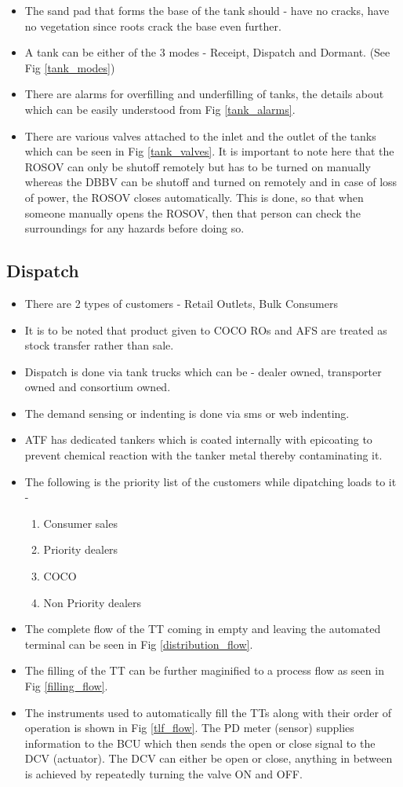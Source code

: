 \documentclass{report}
\begin{document}
\begin{itemize}
		\item The sand pad that forms the base of the tank should - have no cracks, have no vegetation since roots crack the base even further.
		\item A tank can be either of the 3 modes - Receipt, Dispatch and Dormant. (See Fig \ref{tank_modes})
		\item There are alarms for overfilling and underfilling of tanks, the details about which can be easily understood from Fig \ref{tank_alarms}.
		\item There are various valves attached to the inlet and the outlet of the tanks which can be seen in Fig \ref{tank_valves}. It is important to note here that the ROSOV can only be shutoff remotely but has to be turned on manually whereas the DBBV can be shutoff and turned on remotely and in case of loss of power, the ROSOV closes automatically. This is done, so that when someone manually opens the ROSOV, then that person can check the surroundings for any hazards before doing so.
	\end{itemize}
	\subsection{Dispatch}
	\begin{itemize}
		\item There are 2 types of customers - Retail Outlets, Bulk Consumers
		\item It is to be noted that product given to COCO ROs and AFS are treated as stock transfer rather than sale.
		\item Dispatch is done via tank trucks which can be - dealer owned, transporter owned and consortium owned.
		\item The demand sensing or indenting is done via sms or web indenting.
		\item ATF has dedicated tankers which is coated internally with epicoating to prevent chemical reaction with the tanker metal thereby contaminating it.
		\item The following is the priority list of the customers while dipatching loads to it - 
		\begin{enumerate}
			\item Consumer sales
			\item Priority dealers 
			\item COCO
			\item Non Priority dealers
		\end{enumerate}
		\item The complete flow of the TT coming in empty and leaving the automated terminal can be seen in Fig \ref{distribution_flow}.
		\item The filling of the TT can be further maginified to a process flow as seen in Fig \ref{filling_flow}.
		\item The instruments used to automatically fill the TTs along with their order of operation is shown in Fig \ref{tlf_flow}. The PD meter (sensor) supplies information to the BCU which then sends the open or close signal to the DCV (actuator). The DCV can either be open or close, anything in between is achieved by repeatedly turning the valve ON and OFF.
	\end{itemize}
\end{document}
